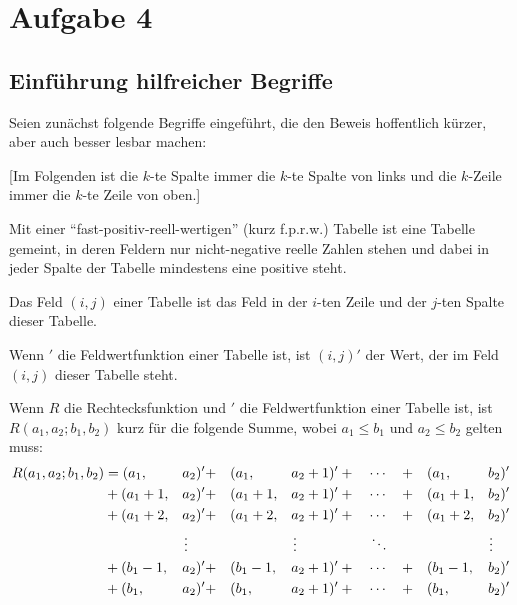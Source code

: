 \section{Aufgabe 4}

\subsection*{Einführung hilfreicher Begriffe}

Seien zunächst folgende Begriffe eingeführt, die den Beweis hoffentlich kürzer, aber auch besser lesbar machen:

[Im Folgenden ist die $k$-te Spalte immer die $k$-te Spalte von links und die $k$-Zeile immer die $k$-te Zeile von oben.]
\begin{definition}
    Mit einer "`fast-positiv-reell-wertigen"' (kurz f.p.r.w.) Tabelle ist eine Tabelle gemeint, in deren Feldern nur 
    nicht-negative reelle Zahlen stehen und dabei in jeder Spalte der Tabelle mindestens eine positive steht.
\end{definition}
\begin{definition}
    Das Feld $(i, j)$ einer Tabelle ist das Feld in der $i$-ten Zeile und der $j$-ten Spalte dieser Tabelle.
\end{definition}
\begin{definition}
    Wenn $'$ die Feldwertfunktion einer Tabelle ist, ist $(i, j)'$ der Wert, der im Feld $(i, j)$ dieser Tabelle 
    steht.
\end{definition}
\begin{definition}\label{rfunktion}
    Wenn $R$ die Rechtecksfunktion und $'$ die Feldwertfunktion einer Tabelle ist, ist $R(a_1, a_2; b_1, b_2)$ kurz 
    für die folgende Summe, wobei $a_1\leq b_1$ und $a_2\leq b_2$ gelten muss:
    \begin{alignat*}{6}
        R(a_1, a_2; b_1, b_2) &= (a_1, &&a_2)' + &&(a_1, &&a_2+1)' + \quad \cdots \quad + &&(a_1, &&b_2)'\\
        &+(a_1+1, &&a_2)' + &&(a_1+1, &&a_2+1)' +\quad \cdots \quad + &&(a_1+1, &&b_2)'\\
        &+(a_1+2, &&a_2)' + &&(a_1+2, &&a_2+1)' +\quad \cdots \quad + &&(a_1+2, &&b_2)'\\
        & &&\vdotswithin{a} && &&\vdotswithin{a}\quad\quad\quad\quad\quad \ddots && &&\vdotswithin{b} \\
        &+(b_1-1, &&a_2)' + &&(b_1-1, &&a_2+1)' +\quad \cdots \quad + &&(b_1-1, &&b_2)'\\
        &+(b_1, &&a_2)' + &&(b_1, &&a_2+1)' + \quad \cdots \quad + &&(b_1, &&b_2)'
    \end{alignat*}    
\end{definition}
